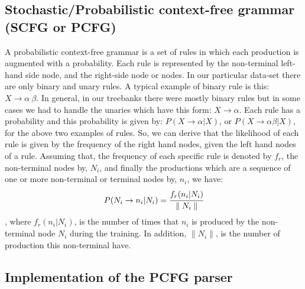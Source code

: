 \documentclass[a4paper,11pt]{article}
\begin{document}
\subsection{Stochastic/Probabilistic context-free grammar (SCFG or PCFG)}
A probabilistic context-free grammar is a set of rules in which each production is augmented with a probability. Each rule is represented by the non-terminal left-hand side node, and the right-side node or nodes. In our particular data-set there are only binary and unary rules. A typical example of  binary rule is this: $X \rightarrow \alpha\	 \beta$. In general, in our treebanks there were mostly binary rules but in some cases we had to handle the unaries which have this form: $X \rightarrow \alpha$. Each rule has a probability and this probability is given by: $P(X \rightarrow \alpha | X)$, or $P(X \rightarrow \alpha \beta| X)$, for the above two examples of rules. So, we can derive that the likelihood of each rule is given by the frequency of the right hand nodes, given the left hand nodes of a rule. Assuming that, the frequency of each specific rule is denoted by $f_r$, the non-terminal nodes by, $N_i$, and finally the productions which are a sequence of one or more non-terminal or terminal nodes by, $n_i$, we have:
\[
P(N_i \rightarrow n_i | N_i) = \cfrac{f_r(n_i | N_i)}{\parallel N_i \parallel}
\]
, where $f_r(n_i | N_i)$, is the number of times that $n_i$ is produced by the non-terminal node $N_i$ during the training. In addition, $\parallel N_i \parallel$, is the number of production this non-terminal have.



\subsection{Implementation of the PCFG parser}
\end{document}
